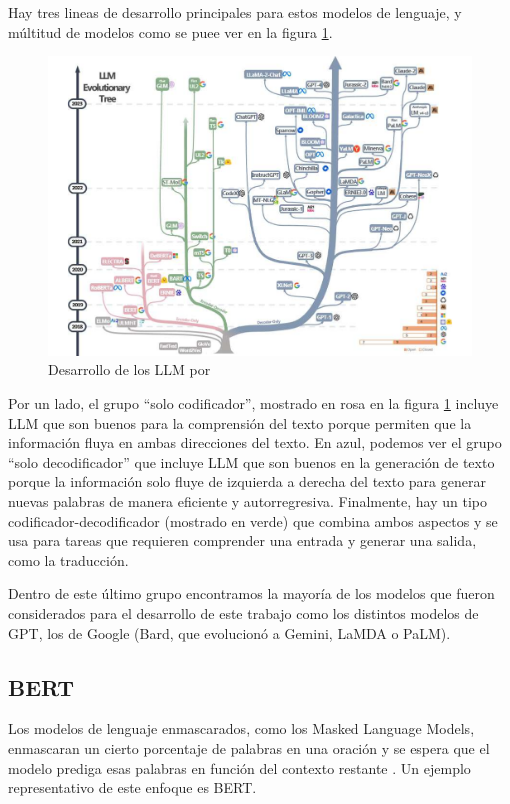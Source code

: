 Hay tres lineas de desarrollo principales para estos modelos de lenguaje, y múltitud de modelos como se puee ver en la figura \ref{fig:3.1}. 

\begin{figure}[h]
	\centering
	\includegraphics[width=1\textwidth]{Imagenes/treeLLM}
	\caption{Desarrollo de los LLM por\cite{yang2023harnessing}}
	\label{fig:3.1}
\end{figure}

Por un lado, el grupo ``solo codificador'', mostrado en rosa en la figura \ref{fig:3.1} incluye LLM que son buenos para la comprensión del texto porque permiten que la información fluya en ambas direcciones del texto. En azul, podemos ver el grupo ``solo decodificador'' que incluye LLM que son buenos en la generación de texto porque la información solo fluye de izquierda a derecha del texto para generar nuevas palabras de manera eficiente y autorregresiva. Finalmente, hay un tipo codificador-decodificador (mostrado en verde) que combina ambos aspectos y se usa para tareas que requieren comprender una entrada y generar una salida, como la traducción. 

Dentro de este último grupo encontramos la mayoría de los modelos que fueron considerados para el desarrollo de este trabajo como los distintos modelos de GPT, los de Google (Bard, que evolucionó a Gemini, LaMDA o PaLM).
\subsection{BERT}
Los modelos de lenguaje enmascarados, como los Masked Language Models, enmascaran un cierto porcentaje de palabras en una oración y se espera que el modelo prediga esas palabras en función del contexto restante \cite{rothman2022}. Un ejemplo representativo de este enfoque es BERT.

